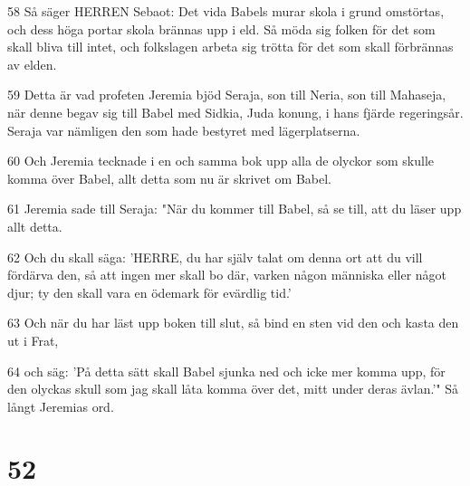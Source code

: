 \par 58 Så säger HERREN Sebaot: Det vida Babels murar skola i grund omstörtas, och dess höga portar skola brännas upp i eld. Så möda sig folken för det som skall bliva till intet, och folkslagen arbeta sig trötta för det som skall förbrännas av elden.
\par 59 Detta är vad profeten Jeremia bjöd Seraja, son till Neria, son till Mahaseja, när denne begav sig till Babel med Sidkia, Juda konung, i hans fjärde regeringsår. Seraja var nämligen den som hade bestyret med lägerplatserna.
\par 60 Och Jeremia tecknade i en och samma bok upp alla de olyckor som skulle komma över Babel, allt detta som nu är skrivet om Babel.
\par 61 Jeremia sade till Seraja: "När du kommer till Babel, så se till, att du läser upp allt detta.
\par 62 Och du skall säga: 'HERRE, du har själv talat om denna ort att du vill fördärva den, så att ingen mer skall bo där, varken någon människa eller något djur; ty den skall vara en ödemark för evärdlig tid.'
\par 63 Och när du har läst upp boken till slut, så bind en sten vid den och kasta den ut i Frat,
\par 64 och säg: 'På detta sätt skall Babel sjunka ned och icke mer komma upp, för den olyckas skull som jag skall låta komma över det, mitt under deras ävlan.'" Så långt Jeremias ord.

\chapter{52}

